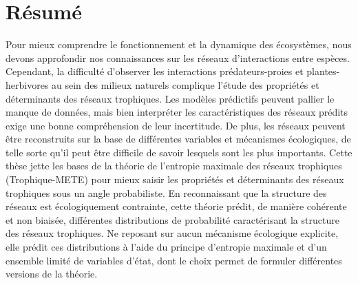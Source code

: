 \documentclass[12pt,twoside,phd]{dms}
\numberwithin{equation}{section}
\numberwithin{table}{chapter}
\numberwithin{figure}{chapter}
\begin{document}
\maketitle
\newpage
\maketitle

\doublespacing


\francais

\setlength{\parskip}{6pt} %

\chapter*{Résumé}

Pour mieux comprendre le fonctionnement et la dynamique des écosystèmes, nous
devons approfondir nos connaissances sur les réseaux d'interactions entre
espèces. Cependant, la difficulté d'observer les interactions prédateurs-proies
et plantes-herbivores au sein des milieux naturels complique l'étude des
propriétés et déterminants des réseaux trophiques. Les modèles prédictifs
peuvent pallier le manque de données, mais bien interpréter les caractéristiques
des réseaux prédits exige une bonne compréhension de leur incertitude. De plus,
les réseaux peuvent être reconstruits sur la base de différentes variables et
mécanismes écologiques, de telle sorte qu'il peut être difficile de savoir
lesquels sont les plus importants. Cette thèse jette les bases de la théorie de
l'entropie maximale des réseaux trophiques (Trophique-METE) pour mieux saisir
les propriétés et déterminants des réseaux trophiques sous un angle
probabiliste. En reconnaissant que la structure des réseaux est écologiquement
contrainte, cette théorie prédit, de manière cohérente et non biaisée,
différentes distributions de probabilité caractérisant la structure des réseaux
trophiques. Ne reposant sur aucun mécanisme écologique explicite, elle prédit
ces distributions à l'aide du principe d'entropie maximale et d'un ensemble
limité de variables d'état, dont le choix permet de formuler différentes
versions de la théorie. 
\end{document}
